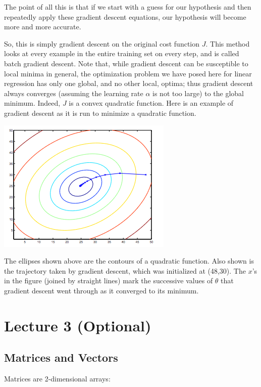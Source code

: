 \documentclass[UTF8]{article}
\begin{document}
The point of all this is that if we start with a guess for our hypothesis and then repeatedly apply these gradient descent equations, our hypothesis will become more and more accurate.

So, this is simply gradient descent on the original cost function $J$. This method looks at every example in the entire training set on every step, and is called batch gradient descent. Note that, while gradient descent can be susceptible to local minima in general, the optimization problem we have posed here for linear regression has only one global, and no other local, optima; thus gradient descent always converges (assuming the learning rate $\alpha$ is not too large) to the global minimum. Indeed, $J$ is a convex quadratic function. Here is an example of gradient descent as it is run to minimize a quadratic function.

\includegraphics[width = .8\textwidth]{NotePics/2_3_2_2.png}

The ellipses shown above are the contours of a quadratic function. Also shown is the trajectory taken by gradient descent, which was initialized at (48,30). The $x$'s in the figure (joined by straight lines) mark the successive values of $\theta$ that gradient descent went through as it converged to its minimum.

\section{Lecture 3 (Optional)}

\subsection{Matrices and Vectors}

Matrices are 2-dimensional arrays:
\end{document}
